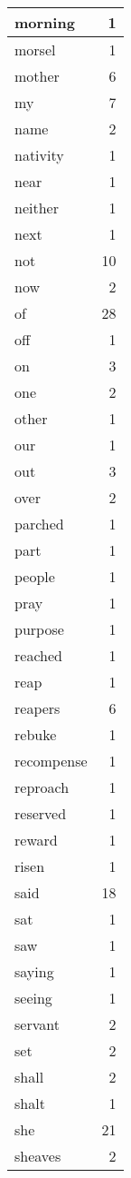\begin{center}
\begin{longtable}{l|r}
morning & 1 \\ \hline
morsel & 1 \\ \hline
mother & 6 \\ \hline
my & 7 \\ \hline
name & 2 \\ \hline
nativity & 1 \\ \hline
near & 1 \\ \hline
neither & 1 \\ \hline
next & 1 \\ \hline
not & 10 \\ \hline
now & 2 \\ \hline
of & 28 \\ \hline
off & 1 \\ \hline
on & 3 \\ \hline
one & 2 \\ \hline
other & 1 \\ \hline
our & 1 \\ \hline
out & 3 \\ \hline
over & 2 \\ \hline
parched & 1 \\ \hline
part & 1 \\ \hline
people & 1 \\ \hline
pray & 1 \\ \hline
purpose & 1 \\ \hline
reached & 1 \\ \hline
reap & 1 \\ \hline
reapers & 6 \\ \hline
rebuke & 1 \\ \hline
recompense & 1 \\ \hline
reproach & 1 \\ \hline
reserved & 1 \\ \hline
reward & 1 \\ \hline
risen & 1 \\ \hline
said & 18 \\ \hline
sat & 1 \\ \hline
saw & 1 \\ \hline
saying & 1 \\ \hline
seeing & 1 \\ \hline
servant & 2 \\ \hline
set & 2 \\ \hline
shall & 2 \\ \hline
shalt & 1 \\ \hline
she & 21 \\ \hline
sheaves & 2 \\ \hline

\end{longtable}
\end{center}

